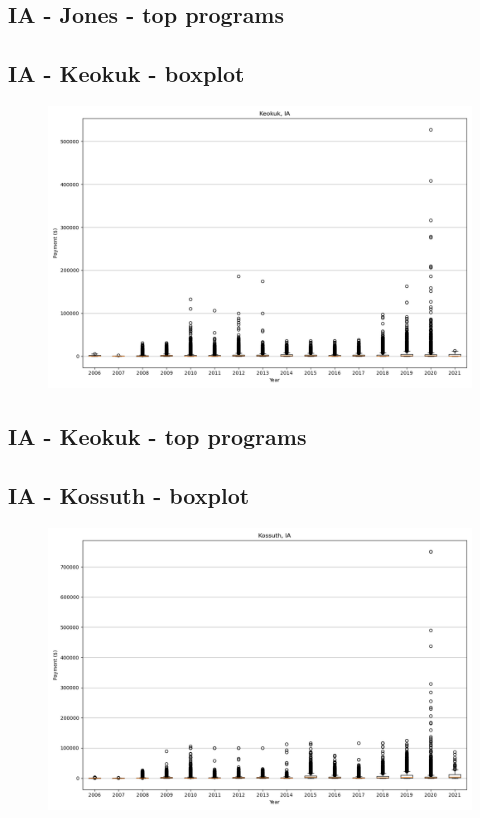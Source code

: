 \subsection*{IA - Jones - top programs}

\newpage
\subsection*{IA - Keokuk - boxplot}
\begin{figure}[h]
\centering
\includegraphics[width=7in]{../output/boxplots/counties/Keokuk-IA_boxplot.png}
\end{figure}


\subsection*{IA - Keokuk - top programs}

\newpage
\subsection*{IA - Kossuth - boxplot}
\begin{figure}[h]
\centering
\includegraphics[width=7in]{../output/boxplots/counties/Kossuth-IA_boxplot.png}
\end{figure}


